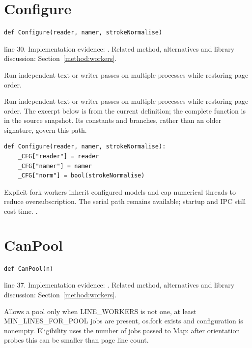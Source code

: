 \section{Configure}\label{fn:web-lineworkers:Configure}
\begin{lstlisting}[style=sig]
def Configure(reader, namer, strokeNormalise)
\end{lstlisting}
 line 30. Implementation evidence: \cite{code2026}. Related method, alternatives and library discussion: Section~\ref{method:workers}.


Run independent text or writer passes on multiple processes while restoring page order.


Run independent text or writer passes on multiple processes while restoring page order. The excerpt below is from the current definition; the complete function is in the source snapshot. Its constants and branches, rather than an older signature, govern this path.


\begin{lstlisting}[style=plain]
def Configure(reader, namer, strokeNormalise):
    _CFG["reader"] = reader
    _CFG["namer"] = namer
    _CFG["norm"] = bool(strokeNormalise)
\end{lstlisting}
Explicit fork workers inherit configured models and cap numerical threads to reduce oversubscription. The serial path remains available; startup and IPC still cost time. \cite{pythonmp,numpymatmul}.


\section{CanPool}\label{fn:web-lineworkers:CanPool}
\begin{lstlisting}[style=sig]
def CanPool(n)
\end{lstlisting}
 line 37. Implementation evidence: \cite{code2026}. Related method, alternatives and library discussion: Section~\ref{method:workers}.


Allows a pool only when LINE\_WORKERS is not one, at least MIN\_LINES\_FOR\_POOL jobs are present, os.fork exists and configuration is nonempty. Eligibility uses the number of jobs passed to Map: after orientation probes this can be smaller than page line count.


